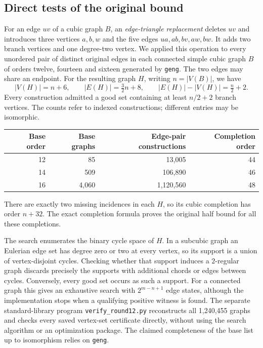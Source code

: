 \documentclass[11pt]{article}
\begin{document}
\subsection{Direct tests of the original bound}
For an edge $uv$ of a cubic graph $B$, an \emph{edge-triangle
replacement} deletes $uv$ and introduces three vertices $a,b,w$
and the five edges $ua,ab,bv,aw,bw$. It adds two branch vertices
and one degree-two vertex. We applied this operation to every
unordered pair of distinct original edges in each connected simple
cubic graph $B$ of orders twelve, fourteen and sixteen generated
by \texttt{geng}. The two edges may share an endpoint.
For the resulting graph $H$, writing $n=|V(B)|$, we have
\[
 |V(H)|=n+6,\qquad |E(H)|=\tfrac32n+8,
 \qquad |E(H)|-|V(H)|=\tfrac n2+2.
\]
Every construction admitted a good set containing at least
$n/2+2$ branch vertices. The counts refer to indexed constructions;
different entries may be isomorphic.
\begin{center}
\begin{tabular}{rrrr}
\toprule
Base order & Base graphs & Edge-pair constructions & Completion order\\
\midrule
12 & 85 & 13,005 & 44\\
14 & 509 & 106,890 & 46\\
16 & 4,060 & 1,120,560 & 48\\
\bottomrule
\end{tabular}
\end{center}
There are exactly two missing incidences in each $H$, so its cubic
completion has order $n+32$. The exact completion formula proves
the original half bound for all these completions.

The search enumerates the binary cycle space of $H$. In a subcubic
graph an Eulerian edge set has degree zero or two at every vertex,
so its support is a union of vertex-disjoint cycles. Checking whether
that support induces a $2$-regular graph discards precisely the
supports with additional chords or edges between cycles. Conversely,
every good set occurs as such a support. For a connected graph this
gives an exhaustive search with $2^{m-n+1}$ edge states, although the
implementation stops when a qualifying positive witness is found.
The separate standard-library program \texttt{verify\_round12.py}
reconstructs all 1,240,455 graphs and checks every saved vertex-set
certificate directly, without using the search algorithm or an
optimization package. The claimed completeness of the base list up
to isomorphism relies on \texttt{geng}.
\end{document}
